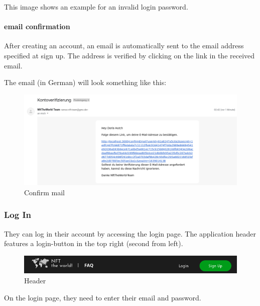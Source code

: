 \documentclass[
]{article}
\begin{document}
This image shows an example for an invalid login password.

\hypertarget{email-confirmation}{%
\paragraph{email confirmation}\label{email-confirmation}}

After creating an account, an email is automatically sent to the email
address specified at sign up. The address is verified by clicking on the
link in the received email.

The email (in German) will look something like this:

\begin{figure}
\centering
\includegraphics{images/account_confirmation_email.png}
\caption{Confirm mail}
\end{figure}\newpage

\hypertarget{log-in}{%
\subsubsection{Log In}\label{log-in}}

They can log in their account by accessing the login page. The
application header features a login-button in the top right (second from
left).

\begin{figure}
\centering
\includegraphics{images/header.png}
\caption{Header}
\end{figure}

On the login page, they need to enter their email and password.
\end{document}
